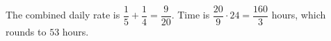 The combined daily rate is $\dfrac{1}{5}+\dfrac{1}{4}=\dfrac{9}{20}$. Time is $\dfrac{20}{9}\cdot24=\dfrac{160}{3}$ hours, which rounds to $\boxed{53}$ hours.
